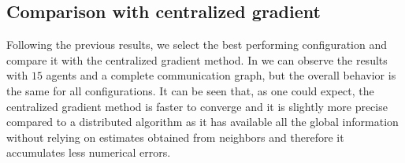 \documentclass[a4paper,11pt,oneside]{book}
\begin{document}
\subsection{Comparison with centralized gradient}

Following the previous results, we select the best performing configuration and compare it with the centralized gradient method. In  we can observe the results with $15$ agents and a complete communication graph, but the overall behavior is the same for all configurations. It can be seen that, as one could expect, the centralized gradient method is faster to converge and it is slightly more precise compared to a distributed algorithm as it has available all the global information without relying on estimates obtained from neighbors and therefore it accumulates less numerical errors.
\end{document}
